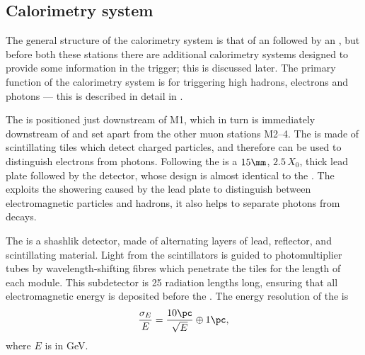 \subsection{Calorimetry system}

The general structure of the calorimetry system is that of an \ecal followed by an \hcal, but
before both these stations there are additional calorimetry systems designed to provide some \pid
information in the trigger; this is discussed later.
The primary function of the calorimetry system is for triggering high \pt hadrons, electrons and
photons --- this is described in detail in .

The \spd is positioned just downstream of M1, which in turn is immediately downstream of \richtwo
and set apart from the other muon stations M2--4.
The \spd is made of scintillating tiles which detect charged particles, and therefore can be used
to distinguish electrons from photons.
Following the \spd is a $15\mm$, $2.5\,X_0$, thick lead plate followed by the \presh detector,
whose design is almost identical to the \spd.
The \presh exploits the showering caused by the lead plate to distinguish between electromagnetic
particles and hadrons, it also helps to separate photons from \piz decays.

The \ecal is a shashlik detector, made of alternating layers of lead, reflector, and scintillating
material.
Light from the scintillators is guided to photomultiplier tubes by wavelength-shifting fibres which
penetrate the tiles for the length of each module.
This \ecal subdetector is 25 radiation lengths long,  ensuring that all electromagnetic energy is
deposited before the \hcal.
The energy resolution of the \ecal is
\begin{equation}
  \frac{\sigma_E}{E} = \frac{10\pc}{\sqrt{E}} \oplus 1\pc,
\end{equation}
where $E$ is in GeV.

